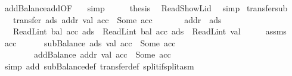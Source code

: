\begin{isabellebody}
\ addBalance{\isacharunderscore}{\kern0pt}add{\isacharbrackleft}{\kern0pt}OF\ {\isacharasterisk}{\kern0pt}{\isacharasterisk}{\kern0pt}{\isacharbrackright}{\kern0pt}\ \isamarkupfalse%
\ simp\isanewline
\ \ \isamarkupfalse%
\ \isamarkupfalse%
\ {\isacharquery}{\kern0pt}thesis\ \isamarkupfalse%
\ Read{\isacharunderscore}{\kern0pt}ShowL{\isacharunderscore}{\kern0pt}id\ \isamarkupfalse%
\ simp\isanewline
{}\isamarkupfalse%
%
\endisatagproof
{\isafoldproof}%
%
\isadelimproof
\isanewline
%
\endisadelimproof
\isanewline
{}\isamarkupfalse%
\ transfer{\isacharunderscore}{\kern0pt}sub{\isacharcolon}{\kern0pt}\isanewline
\ \ \ {\isachardoublequoteopen}transfer\ ads\ addr\ val\ acc\ {\isacharequal}{\kern0pt}\ Some\ acc{\isacharprime}{\kern0pt}{\isachardoublequoteclose}\isanewline
\ \ \ \ \ \ \ {\isachardoublequoteopen}addr\ {\isasymnoteq}\ ads{\isachardoublequoteclose}\isanewline
\ \ \ {\isachardoublequoteopen}ReadL\isactrlsub i\isactrlsub n\isactrlsub t\ {\isacharparenleft}{\kern0pt}bal\ {\isacharparenleft}{\kern0pt}acc{\isacharprime}{\kern0pt}\ ads{\isacharparenright}{\kern0pt}{\isacharparenright}{\kern0pt}\ {\isacharequal}{\kern0pt}\ ReadL\isactrlsub i\isactrlsub n\isactrlsub t\ {\isacharparenleft}{\kern0pt}bal\ {\isacharparenleft}{\kern0pt}acc\ ads{\isacharparenright}{\kern0pt}{\isacharparenright}{\kern0pt}\ {\isacharminus}{\kern0pt}\ ReadL\isactrlsub i\isactrlsub n\isactrlsub t\ val{\isachardoublequoteclose}\isanewline
%
\isadelimproof
%
\endisadelimproof
%
\isatagproof
{}\isamarkupfalse%
\ {\isacharminus}{\kern0pt}\isanewline
\ \ \isamarkupfalse%
\ assms{\isacharparenleft}{\kern0pt}{}{\isacharparenright}{\kern0pt}\ \isamarkupfalse%
\ acc{\isacharprime}{\kern0pt}{\isacharprime}{\kern0pt}\isanewline
\ \ \ \ \ {\isacharasterisk}{\kern0pt}{\isacharcolon}{\kern0pt}\ {\isachardoublequoteopen}subBalance\ ads\ val\ acc\ {\isacharequal}{\kern0pt}\ Some\ acc{\isacharprime}{\kern0pt}{\isacharprime}{\kern0pt}{\isachardoublequoteclose}\isanewline
\ \ \ \ \ \ \ {\isacharasterisk}{\kern0pt}{\isacharasterisk}{\kern0pt}{\isacharcolon}{\kern0pt}\ {\isachardoublequoteopen}addBalance\ addr\ val\ acc{\isacharprime}{\kern0pt}{\isacharprime}{\kern0pt}\ {\isacharequal}{\kern0pt}\ Some\ acc{\isacharprime}{\kern0pt}{\isachardoublequoteclose}\ \isamarkupfalse%
\ {\isacharparenleft}{\kern0pt}simp\ add{\isacharcolon}{\kern0pt}\ subBalance{\isacharunderscore}{\kern0pt}def\ transfer{\isacharunderscore}{\kern0pt}def\ split{\isacharcolon}{\kern0pt}if{\isacharunderscore}{\kern0pt}split{\isacharunderscore}{\kern0pt}asm{\isacharparenright}{\kern0pt}\isanewline

\end{isabellebody}
